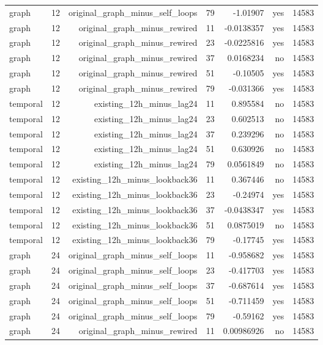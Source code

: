\begin{tabular}{lrrrrrr}
graph & 12 & original\_graph\_minus\_self\_loops & 79 & -1.01907 & yes & 14583 \\
graph & 12 & original\_graph\_minus\_rewired & 11 & -0.0138357 & yes & 14583 \\
graph & 12 & original\_graph\_minus\_rewired & 23 & -0.0225816 & yes & 14583 \\
graph & 12 & original\_graph\_minus\_rewired & 37 & 0.0168234 & no & 14583 \\
graph & 12 & original\_graph\_minus\_rewired & 51 & -0.10505 & yes & 14583 \\
graph & 12 & original\_graph\_minus\_rewired & 79 & -0.031366 & yes & 14583 \\
temporal & 12 & existing\_12h\_minus\_lag24 & 11 & 0.895584 & no & 14583 \\
temporal & 12 & existing\_12h\_minus\_lag24 & 23 & 0.602513 & no & 14583 \\
temporal & 12 & existing\_12h\_minus\_lag24 & 37 & 0.239296 & no & 14583 \\
temporal & 12 & existing\_12h\_minus\_lag24 & 51 & 0.630926 & no & 14583 \\
temporal & 12 & existing\_12h\_minus\_lag24 & 79 & 0.0561849 & no & 14583 \\
temporal & 12 & existing\_12h\_minus\_lookback36 & 11 & 0.367446 & no & 14583 \\
temporal & 12 & existing\_12h\_minus\_lookback36 & 23 & -0.24974 & yes & 14583 \\
temporal & 12 & existing\_12h\_minus\_lookback36 & 37 & -0.0438347 & yes & 14583 \\
temporal & 12 & existing\_12h\_minus\_lookback36 & 51 & 0.0875019 & no & 14583 \\
temporal & 12 & existing\_12h\_minus\_lookback36 & 79 & -0.17745 & yes & 14583 \\
graph & 24 & original\_graph\_minus\_self\_loops & 11 & -0.958682 & yes & 14583 \\
graph & 24 & original\_graph\_minus\_self\_loops & 23 & -0.417703 & yes & 14583 \\
graph & 24 & original\_graph\_minus\_self\_loops & 37 & -0.687614 & yes & 14583 \\
graph & 24 & original\_graph\_minus\_self\_loops & 51 & -0.711459 & yes & 14583 \\
graph & 24 & original\_graph\_minus\_self\_loops & 79 & -0.59162 & yes & 14583 \\
graph & 24 & original\_graph\_minus\_rewired & 11 & 0.00986926 & no & 14583 \\

\end{tabular}
